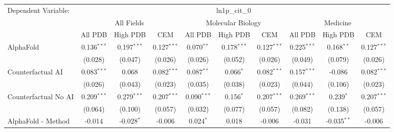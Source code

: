 \begingroup
\centering
\begin{tabular}{lccccccccc}
   \tabularnewline \midrule \midrule
   Dependent Variable: & \multicolumn{9}{c}{ln1p\_cit\_0}\\
 & \multicolumn{3}{c}{All Fields} & \multicolumn{3}{c}{Molecular Biology} & \multicolumn{3}{c}{Medicine} \\
\cmidrule(lr){2-7} \cmidrule(lr){5-10} \cmidrule(lr){8-7}
 & \multicolumn{1}{c}{All PDB} & \multicolumn{1}{c}{High PDB} & \multicolumn{1}{c}{CEM} & \multicolumn{1}{c}{All PDB} & \multicolumn{1}{c}{High PDB} & \multicolumn{1}{c}{CEM} & \multicolumn{1}{c}{All PDB} & \multicolumn{1}{c}{High PDB} & \multicolumn{1}{c}{CEM} \\
\cmidrule(lr){2-3} \cmidrule(lr){3-4} \cmidrule(lr){4-5} \cmidrule(lr){5-6} \cmidrule(lr){6-7} \cmidrule(lr){7-8} \cmidrule(lr){8-9} \cmidrule(lr){9-10} \cmidrule(lr){10-3}
   AlphaFold                                                   & 0.136$^{***}$ & 0.197$^{***}$ & 0.127$^{***}$ & 0.070$^{**}$  & 0.178$^{***}$ & 0.127$^{***}$ & 0.225$^{***}$ & 0.168$^{**}$  & 0.127$^{***}$\\   
                                                               & (0.028)       & (0.047)       & (0.026)       & (0.026)       & (0.052)       & (0.026)       & (0.049)       & (0.079)       & (0.026)\\   
   Counterfactual AI                                           & 0.083$^{***}$ & 0.068         & 0.082$^{***}$ & 0.087$^{**}$  & 0.066$^{*}$   & 0.082$^{***}$ & 0.157$^{***}$ & -0.086        & 0.082$^{***}$\\   
                                                               & (0.026)       & (0.043)       & (0.023)       & (0.035)       & (0.038)       & (0.023)       & (0.044)       & (0.106)       & (0.023)\\   
   Counterfactual No AI                                        & 0.209$^{***}$ & 0.279$^{***}$ & 0.207$^{***}$ & 0.090$^{***}$ & 0.156$^{*}$   & 0.207$^{***}$ & 0.269$^{***}$ & 0.239$^{*}$   & 0.207$^{***}$\\   
                                                               & (0.064)       & (0.100)       & (0.057)       & (0.032)       & (0.077)       & (0.057)       & (0.082)       & (0.138)       & (0.057)\\   
   AlphaFold - Method                                          & -0.014        & -0.028$^{*}$  & -0.006        & 0.024$^{*}$   & 0.018         & -0.006        & -0.031        & -0.035$^{**}$ & -0.006\\   

\end{tabular}
